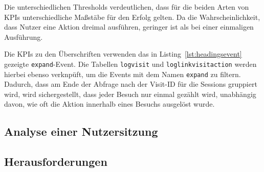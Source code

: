 Die unterschiedlichen Thresholds verdeutlichen, dass für die beiden Arten von KPIs unterschiedliche Maßstäbe für den Erfolg gelten. Da die Wahrscheinlichkeit, dass Nutzer eine Aktion dreimal ausführen, geringer ist als bei einer einmaligen Ausführung.

Die KPIs zu den Überschriften verwenden das in Listing~\ref{lst:headingsevent} gezeigte \texttt{expand}-Event. Die Tabellen \texttt{log\textunderscore visit} und \texttt{log\textunderscore link\textunderscore visit\textunderscore action} werden hierbei ebenso verknpüft, um die Events mit dem Namen \texttt{expand} zu filtern. Dadurch, dass am Ende der Abfrage nach der Visit-ID für die Sessions gruppiert wird, wird sichergestellt, dass jeder Besuch nur einmal gezählt wird, unabhängig davon, wie oft die Aktion innerhalb eines Besuchs ausgelöst wurde. 



\subsection{Analyse einer Nutzersitzung}

\subsection{Herausforderungen}